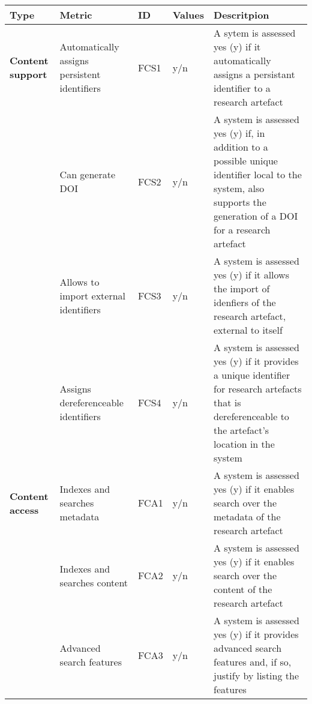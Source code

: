\begin{tabular}
\end{tabular}


\begin{tabular}{|m{2.5cm}|m{3cm}|m{1cm}|m{1cm}|p{8cm}|}
\hline \textbf{Type}&\textbf{Metric}&\textbf{ID}&\textbf{Values}&\textbf{Descritpion}\\ \hline
\textbf{Content support}&Automatically assigns persistent identifiers&FCS1&y/n&A sytem is assessed yes (y) if it automatically assigns a persistant identifier to a research artefact\\ \hline
\textbf{}&Can generate DOI&FCS2&y/n&A system is assessed yes (y) if, in addition to a possible unique identifier local to the system, also supports the generation of a DOI for a research artefact\\ \hline
\textbf{}&Allows to import external identifiers&FCS3&y/n&A system is assessed yes (y) if it allows the import of idenfiers of the research artefact, external to itself\\ \hline
\textbf{}&Assigns dereferenceable identifiers&FCS4&y/n&A system is assessed yes (y) if it provides a unique identifier for research artefacts that is dereferenceable to the artefact's location in the system\\ \hline
\textbf{Content access}&Indexes and searches metadata&FCA1&y/n&A system is assessed yes (y) if it enables search over the metadata of the research artefact\\ \hline
\textbf{}&Indexes and searches content&FCA2&y/n&A system is assessed yes (y) if it enables search over the content of the research artefact\\ \hline
\textbf{}&Advanced search features&FCA3&y/n&A system is assessed yes (y) if it provides advanced search features and, if so, justify by listing the features\\ \hline
\end{tabular}


